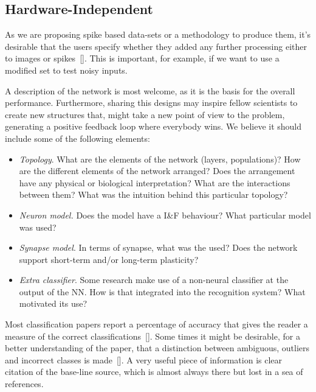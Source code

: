 \subsection{Hardware-Independent}
As we are proposing spike based data-sets or a methodology to produce them, it's desirable that the users specify whether they added any further processing either to images or spikes~[\cite{best-practice-nn-img}]. This is important, for example, if we want to use a modified set to test noisy inputs.

A description of the network is most welcome, as it is the basis for the overall performance. Furthermore, sharing this designs may inspire fellow scientists to create new structures that, might take a new point of view to the problem, generating a positive feedback loop where everybody wins. We believe it should include some of the following elements:
{ 
  \setlength{\leftmargini}{0.3cm}
  \begin{itemize}
    \item[] \hspace*{-0.3cm} \textit{Topology}. \newline
      What are the elements of the network (layers, populations)?
      How are the different elements of the network arranged? Does the arrangement have any physical or biological interpretation? What are the interactions between them? What was the intuition behind this particular topology?
    \item[] \hspace*{-0.3cm} \textit{Neuron model.} \newline
      Does the model have a I\&F behaviour? What particular model was used?
    \item[] \hspace*{-0.3cm} \textit{Synapse model}. \newline
      In terms of synapse, what was the  used? Does the network support short-term and/or long-term plasticity?
    \item[] \hspace*{-0.3cm} \textit{Extra classifier}. \newline
      Some research make use of a non-neural classifier at the output of the NN. How is that integrated into the recognition system? What motivated its use?   
  \end{itemize}
}


Most classification papers report a percentage of accuracy that gives the reader a measure of the correct classifications~[\cite{dietterich1998approximate}]. Some times it might be desirable, for a better understanding of the paper, that a distinction between ambiguous, outliers and incorrect classes is made~[\cite{liu2002performance}]. A very useful piece of information is clear citation of the base-line source, which is almost always there but lost in a sea of references.

